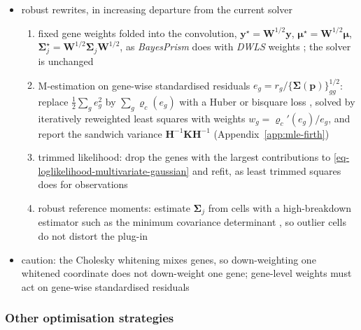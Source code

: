 \begin{itemize}
        by a type missing from the reference, has unbounded influence on \(\hat{\boldsymbol{p}}\); fixed gene
        weights rescale that influence without bounding it
  \item robust rewrites, in increasing departure from the current solver
  \begin{enumerate}
    \item fixed gene weights folded into the convolution,
          \(\boldsymbol{y}^{\star}=\boldsymbol{W}^{1/2}\boldsymbol{y}\), \(\boldsymbol{\mu}^{\star}=\boldsymbol{W}^{1/2}\boldsymbol{\mu}\),
          \(\boldsymbol{\Sigma}_{j}^{\star}=\boldsymbol{W}^{1/2}\boldsymbol{\Sigma}_{j}\boldsymbol{W}^{1/2}\), as \emph{BayesPrism} does with \emph{DWLS}
          weights \cite{zhangIntegratedInferenceCellularCompositions2026}; the solver is unchanged
    \item M-estimation on gene-wise standardised residuals
          \(e_{g}=r_{g}/\{\boldsymbol{\Sigma}(\boldsymbol{p})\}_{gg}^{1/2}\): replace \(\tfrac12\sum_{g}e_{g}^{2}\) by \(\sum_{g}\varrho_{c}(e_{g})\)
          with a Huber or bisquare loss
          \cite{hampelIntroductionHuber19641992,GeneralizedLinearModels2018}, solved by iteratively
          reweighted least squares with weights
          \(w_{g}=\varrho_{c}'(e_{g})/e_{g}\), and report the sandwich variance
          \(\boldsymbol{H}^{-1}\boldsymbol{K}\boldsymbol{H}^{-1}\) (Appendix~\ref{app:mle-firth})
    \item trimmed likelihood: drop the genes with the largest contributions to
          \eqref{eq-loglikelihood-multivariate-gaussian} and refit, as least trimmed squares does for
          observations \cite{rousseeuwComputingLTSRegression2006}
    \item robust reference moments: estimate \(\boldsymbol{\Sigma}_{j}\) from cells with a high-breakdown estimator
          such as the minimum covariance determinant \cite{rousseeuwMultivariateEstimationHigh1985}, so outlier
          cells do not distort the plug-in
  \end{enumerate}
  \item caution: the Cholesky whitening mixes genes, so down-weighting one whitened coordinate does not
        down-weight one gene; gene-level weights must act on gene-wise standardised residuals
\end{itemize}

\subsubsection{Other optimisation strategies}
\label{app:optim-other}


